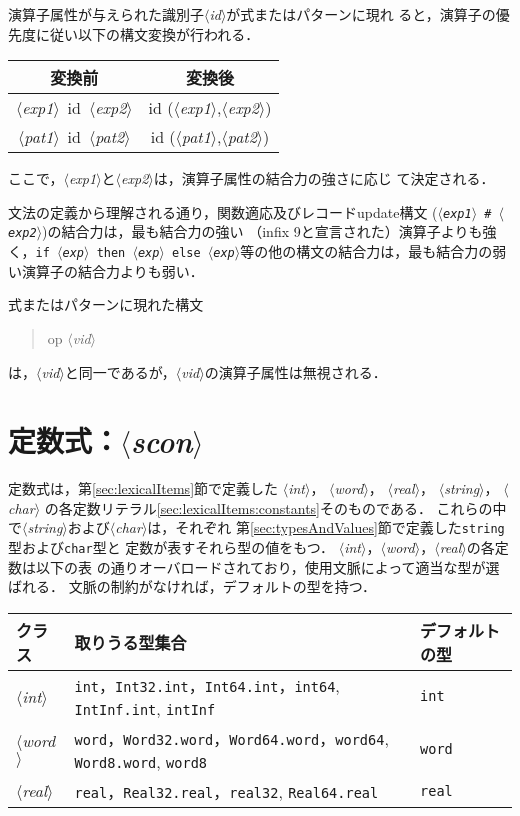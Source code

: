 \documentclass{jbook}
\newcommand{\code}[1]{\mbox{\large\tt #1}}
\newcommand{\nonterm}[1]{\mbox{$\langle$}{\it #1}\mbox{$\rangle$}}
\newenvironment{program}{\begin{quote}\begin{tt}}%
                        {\end{tt}\end{quote}}
\begin{document}
	演算子属性が与えられた識別子\nonterm{id}が式またはパターンに現れ
ると，演算子の優先度に従い以下の構文変換が行われる．

\begin{center}
\begin{tabular}{|c|c|}
\hline
変換前 & 変換後
\\\hline
\nonterm{exp1}\ id\ \nonterm{exp2} & id (\nonterm{exp1},\nonterm{exp2})
\\\hline
\nonterm{pat1}\ id\ \nonterm{pat2} & id (\nonterm{pat1},\nonterm{pat2})	
\\\hline
\end{tabular}
\end{center}

ここで，\nonterm{exp1}と\nonterm{exp2}は，演算子属性の結合力の強さに応じ
て決定される．

	文法の定義から理解される通り，関数適応及びレコードupdate構文
(\code{\nonterm{exp1}\ \#\ \nonterm{exp2}})の結合力は，最も結合力の強い
（infix 9と宣言された）演算子よりも強く，\code{if \nonterm{exp}\ then
\nonterm{exp}\ else \nonterm{exp}}等の他の構文の結合力は，最も結合力の弱
い演算子の結合力よりも弱い．

	式またはパターンに現れた構文
\begin{program}
op \nonterm{vid}
\end{program}
は，\nonterm{vid}と同一であるが，\nonterm{vid}の演算子属性は無視される．


\section{定数式：\nonterm{scon}}
\label{sec:scon}

	定数式は，第\ref{sec:lexicalItems}節で定義した
\nonterm{int}，
\nonterm{word}， 
\nonterm{real}，
\nonterm{string}，
\nonterm{char}
の各定数リテラル\ref{sec:lexicalItems:constants}そのものである．
	これらの中で\nonterm{string}および\nonterm{char}は，それぞれ
第\ref{sec:typesAndValues}節で定義した{\tt string}型および{\tt char}型と
定数が表すそれら型の値をもつ．
	\nonterm{int}，\nonterm{word}，\nonterm{real}の各定数は以下の表
の通りオーバロードされており，使用文脈によって適当な型が選ばれる．
	文脈の制約がなければ，デフォルトの型を持つ．

\begin{center}
\begin{tabular}{|l|l|l|}
\hline
クラス & 取りうる型集合 & デフォルトの型
\\\hline
\nonterm{int} & {\tt int}，{\tt Int32.int}，{\tt Int64.int}，{\tt int64}, {\tt IntInf.int}, {\tt intInf} &  {\tt int}
\\\hline
\nonterm{word} & {\tt word}，{\tt Word32.word}，{\tt Word64.word}，{\tt word64}, {\tt Word8.word}, {\tt word8} &  {\tt word}
\\\hline
\nonterm{real} & {\tt real}，{\tt Real32.real}，{\tt real32}, {\tt Real64.real}&  {\tt real}
\\\hline
\end{tabular}
\end{center}
\end{document}
